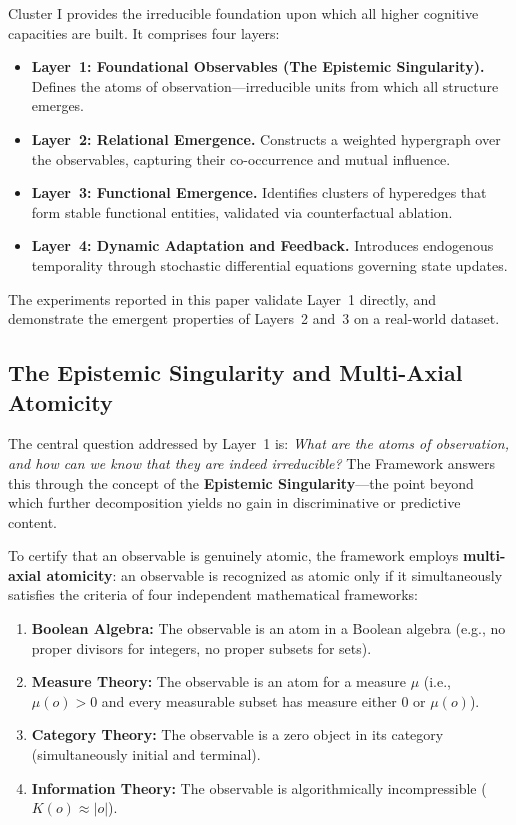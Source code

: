 Cluster I provides the irreducible foundation upon which all higher cognitive capacities are built. It comprises four layers:

\begin{itemize}
    \item \textbf{Layer~1: Foundational Observables (The Epistemic Singularity).} Defines the atoms of observation---irreducible units from which all structure emerges.
    \item \textbf{Layer~2: Relational Emergence.} Constructs a weighted hypergraph over the observables, capturing their co-occurrence and mutual influence.
    \item \textbf{Layer~3: Functional Emergence.} Identifies clusters of hyperedges that form stable functional entities, validated via counterfactual ablation.
    \item \textbf{Layer~4: Dynamic Adaptation and Feedback.} Introduces endogenous temporality through stochastic differential equations governing state updates.
\end{itemize}

The experiments reported in this paper validate Layer~1 directly, and demonstrate the emergent properties of Layers~2 and~3 on a real-world dataset.

\subsection{The Epistemic Singularity and Multi-Axial Atomicity}

The central question addressed by Layer~1 is: \emph{What are the atoms of observation, and how can we know that they are indeed irreducible?} The \Apeiron{} Framework answers this through the concept of the \textbf{Epistemic Singularity}---the point beyond which further decomposition yields no gain in discriminative or predictive content.

To certify that an observable is genuinely atomic, the framework employs \textbf{multi-axial atomicity}: an observable is recognized as atomic only if it simultaneously satisfies the criteria of four independent mathematical frameworks:

\begin{enumerate}
    \item \textbf{Boolean Algebra:} The observable is an atom in a Boolean algebra (e.g., no proper divisors for integers, no proper subsets for sets).
    \item \textbf{Measure Theory:} The observable is an atom for a measure $\mu$ (i.e., $\mu(o) > 0$ and every measurable subset has measure either $0$ or $\mu(o)$).
    \item \textbf{Category Theory:} The observable is a zero object in its category (simultaneously initial and terminal).
    \item \textbf{Information Theory:} The observable is algorithmically incompressible ($K(o) \approx |o|$).
\end{enumerate}

